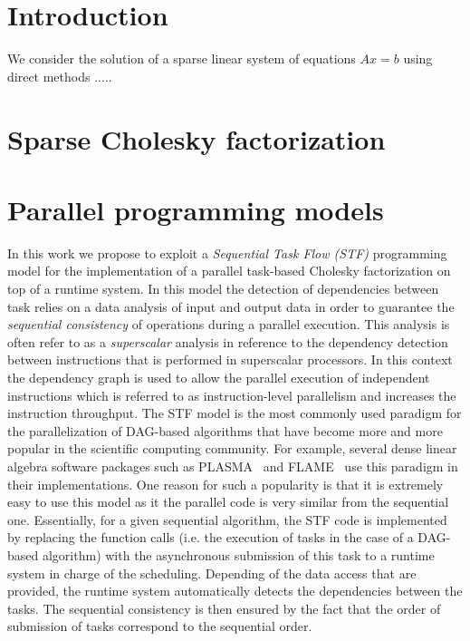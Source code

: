 \documentclass{article}
\begin{document}
\newpage
\setcounter{page}{1}

\section{Introduction} \label{sec:introduction}

We consider the solution of a sparse linear system of equations $Ax = b$ 
using direct methods .....


\section{Sparse Cholesky factorization}\label{sec:chol}
\setcounter{equation}{0}
\setcounter{table}{0}
\setcounter{figure}{0}

\section{Parallel programming models}\label{sec:runtime}

In this work we propose to exploit a \textit{Sequential Task Flow
  (STF)} programming model for the implementation of a parallel
task-based Cholesky factorization on top of a runtime system. In this
model the detection of dependencies between task relies on a data
analysis of input and output data in order to guarantee the
\textit{sequential consistency} of operations during a parallel
execution. This analysis is often refer to as a \textit{superscalar}
analysis in reference to the dependency detection between instructions
that is performed in superscalar processors. In this context the
dependency graph is used to allow the parallel execution of
independent instructions which is referred to as instruction-level
parallelism and increases the instruction throughput. The STF model is
the most commonly used paradigm for the parallelization of DAG-based
algorithms that have become more and more popular in the scientific
computing community. For example, several dense linear algebra
software packages such as PLASMA~\cite{a.d.d.h.ea:09} and
FLAME~\cite{i.c.q.q.ea:12} use this paradigm in their
implementations. One reason for such a popularity is that it is
extremely easy to use this model as it the parallel code is very
similar from the sequential one. Essentially, for a given sequential
algorithm, the STF code is implemented by replacing the function calls
(i.e. the execution of tasks in the case of a DAG-based algorithm)
with the asynchronous submission of this task to a runtime system in
charge of the scheduling. Depending of the data access that are
provided, the runtime system automatically detects the dependencies
between the tasks. The sequential consistency is then ensured by the
fact that the order of submission of tasks correspond to the
sequential order.
\end{document}
